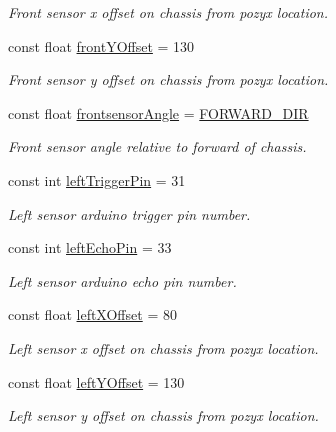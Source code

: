 \begin{DoxyCompactItemize}
\begin{DoxyCompactList}\small\item\em Front sensor x offset on chassis from pozyx location. \end{DoxyCompactList}\item 
const float \mbox{\hyperlink{bot_main_8ino_a4919465d0182f44aa7acaa39ece1e17a}{front\+Y\+Offset}} = 130
\begin{DoxyCompactList}\small\item\em Front sensor y offset on chassis from pozyx location. \end{DoxyCompactList}\item 
const float \mbox{\hyperlink{bot_main_8ino_ad681cfe410d5d764c513368773b9de93}{frontsensor\+Angle}} = \mbox{\hyperlink{bot_main_8ino_afb3e7729ac5d0aab2fec8a9cc664e576}{F\+O\+R\+W\+A\+R\+D\+\_\+\+D\+IR}}
\begin{DoxyCompactList}\small\item\em Front sensor angle relative to forward of chassis. \end{DoxyCompactList}\item 
const int \mbox{\hyperlink{bot_main_8ino_abf577279d52f4a773937cb36cc199c0b}{left\+Trigger\+Pin}} = 31
\begin{DoxyCompactList}\small\item\em Left sensor arduino trigger pin number. \end{DoxyCompactList}\item 
const int \mbox{\hyperlink{bot_main_8ino_ad1b4a0b41d14f603ba696fad472c50d9}{left\+Echo\+Pin}} = 33
\begin{DoxyCompactList}\small\item\em Left sensor arduino echo pin number. \end{DoxyCompactList}\item 
const float \mbox{\hyperlink{bot_main_8ino_a2d121af61e2977de12f5bfbbe8559dca}{left\+X\+Offset}} = 80
\begin{DoxyCompactList}\small\item\em Left sensor x offset on chassis from pozyx location. \end{DoxyCompactList}\item 
const float \mbox{\hyperlink{bot_main_8ino_a7be9826e4f54e376321bcdea4177a8ed}{left\+Y\+Offset}} = 130
\begin{DoxyCompactList}\small\item\em Left sensor y offset on chassis from pozyx location. \end{DoxyCompactList}\item 

\end{DoxyCompactItemize}
